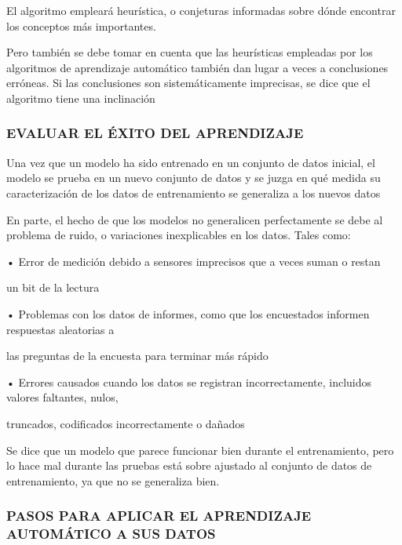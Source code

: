 \documentclass[
  letterpaper,
  DIV=11,
  numbers=noendperiod]{scrartcl}
\begin{document}
El algoritmo empleará heurística, o conjeturas informadas sobre dónde
encontrar los conceptos más importantes.

Pero también se debe tomar en cuenta que las heurísticas empleadas por
los algoritmos de aprendizaje automático también dan lugar a veces a
conclusiones erróneas. Si las conclusiones son sistemáticamente
imprecisas, se dice que el algoritmo tiene una inclinación

\hypertarget{evaluar-el-uxe9xito-del-aprendizaje}{%
\subsubsection{\texorpdfstring{\textbf{EVALUAR EL ÉXITO DEL
APRENDIZAJE}}{EVALUAR EL ÉXITO DEL APRENDIZAJE}}\label{evaluar-el-uxe9xito-del-aprendizaje}}

Una vez que un modelo ha sido entrenado en un conjunto de datos inicial,
el modelo se prueba en un nuevo conjunto de datos y se juzga en qué
medida su caracterización de los datos de entrenamiento se generaliza a
los nuevos datos

En parte, el hecho de que los modelos no generalicen perfectamente se
debe al problema de ruido, o variaciones inexplicables en los datos.
Tales como:

• Error de medición debido a sensores imprecisos que a veces suman o
restan

un bit de la lectura

• Problemas con los datos de informes, como que los encuestados informen
respuestas aleatorias a

las preguntas de la encuesta para terminar más rápido

• Errores causados cuando los datos se registran incorrectamente,
incluidos valores faltantes, nulos,

truncados, codificados incorrectamente o dañados

Se dice que un modelo que parece funcionar bien durante el
entrenamiento, pero lo hace mal durante las pruebas está sobre ajustado
al conjunto de datos de entrenamiento, ya que no se generaliza bien.

\hypertarget{pasos-para-aplicar-el-aprendizaje-automuxe1tico-a-sus-datos}{%
\subsubsection{\texorpdfstring{\textbf{PASOS PARA APLICAR EL APRENDIZAJE
AUTOMÁTICO A SUS
DATOS}}{PASOS PARA APLICAR EL APRENDIZAJE AUTOMÁTICO A SUS DATOS}}\label{pasos-para-aplicar-el-aprendizaje-automuxe1tico-a-sus-datos}}
\end{document}
